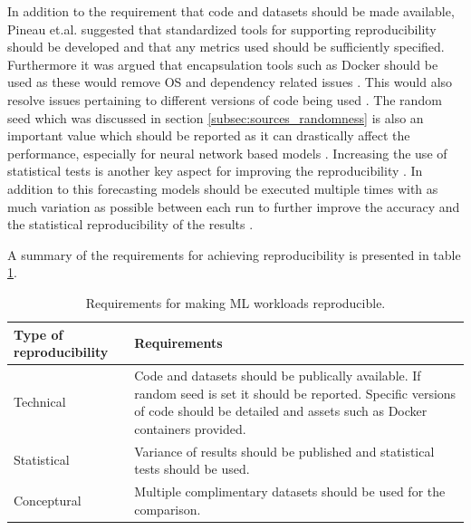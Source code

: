 In addition to the requirement that code and datasets should be made available, Pineau et.al. suggested that standardized tools for supporting reproducibility should be developed and that any metrics used should be sufficiently specified. Furthermore it was argued that encapsulation tools such as Docker should be used as these would remove OS and dependency related issues \cite{pineau2020improving}. This would also resolve issues pertaining to different versions of code being used \cite{beam2020challenges}. The random seed which was discussed in section \ref{subsec:sources_randomness} is also an important value which should be reported as it can drastically affect the performance, especially for neural network based models \cite{beam2020challenges, bouthillier2021accounting}. Increasing the use of statistical tests is another key aspect for improving the reproducibility \cite{mcdermott2019reproducibility}. In addition to this forecasting models should be executed multiple times with as much variation as possible between each run to further improve the accuracy and the statistical reproducibility of the results
\cite{bouthillier2021accounting}.

A summary of the requirements for achieving reproducibility is presented in table \ref{tab:reproducibility}.

\begin{table}[h]
    \centering
    \begin{tabularx}{\textwidth}{|l|X|}
        \hline
        Type of reproducibility & Requirements                                                                                                                                                                               \\
        \hline
        \hline
        Technical               & Code and datasets should be publically available. If random seed is set it should be reported. Specific versions of code should be detailed and assets such as Docker containers provided. \\
        \hline
        Statistical             & Variance of results should be published and statistical tests should be used.                                                                                                              \\
        \hline
        Conceptural             & Multiple complimentary datasets should be used for the comparison.                                                                                                                         \\
        \hline
    \end{tabularx}
    \caption{Requirements for making ML workloads reproducible.}
    \label{tab:reproducibility}
\end{table}


